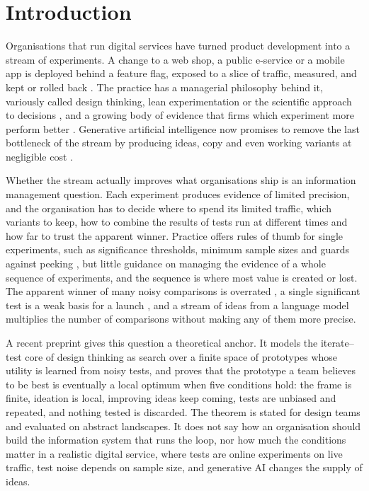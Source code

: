 \documentclass[preprint,12pt,authoryear]{elsarticle}
\theoremstyle{definition}
\begin{document}
\linenumbers

\section{Introduction}
\label{sec:intro}

Organisations that run digital services have turned product development into a stream of experiments. A change to a web shop, a public e-service or a mobile app is deployed behind a feature flag, exposed to a slice of traffic, measured, and kept or rolled back \citep{kohavi2009, kohavi2020, fabijan2017}. The practice has a managerial philosophy behind it, variously called design thinking, lean experimentation or the scientific approach to decisions \citep{brown2008, ries2011, camuffo2020, thomke2020}, and a growing body of evidence that firms which experiment more perform better \citep{brynjolfsson2016, koning2022}. Generative artificial intelligence now promises to remove the last bottleneck of the stream by producing ideas, copy and even working variants at negligible cost \citep{dwivedi2023, girotra2023, noy2023}.

Whether the stream actually improves what organisations ship is an information management question. Each experiment produces evidence of limited precision, and the organisation has to decide where to spend its limited traffic, which variants to keep, how to combine the results of tests run at different times and how far to trust the apparent winner. Practice offers rules of thumb for single experiments, such as significance thresholds, minimum sample sizes and guards against peeking \citep{kohavi2020, johari2022}, but little guidance on managing the evidence of a whole sequence of experiments, and the sequence is where most value is created or lost. The apparent winner of many noisy comparisons is overrated \citep{smithwinkler2006, lee2018}, a single significant test is a weak basis for a launch \citep{gelman2014, azevedo2020}, and a stream of ideas from a language model multiplies the number of comparisons without making any of them more precise.

A recent preprint \citep{kuras2026} gives this question a theoretical anchor. It models the iterate--test core of design thinking as search over a finite space of prototypes whose utility is learned from noisy tests, and proves that the prototype a team believes to be best is eventually a local optimum when five conditions hold: the frame is finite, ideation is local, improving ideas keep coming, tests are unbiased and repeated, and nothing tested is discarded. The theorem is stated for design teams and evaluated on abstract landscapes. It does not say how an organisation should build the information system that runs the loop, nor how much the conditions matter in a realistic digital service, where tests are online experiments on live traffic, test noise depends on sample size, and generative AI changes the supply of ideas.
\end{document}
